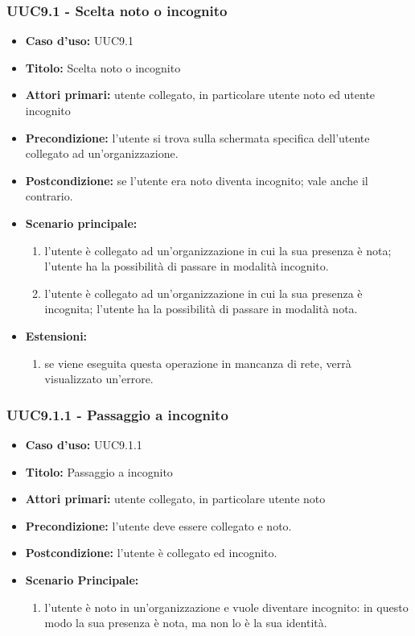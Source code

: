 \documentclass[casi-duso]{subfiles}
\begin{document}
\subsubsection{UUC9.1 - Scelta noto o incognito}%
\label{subsub:UUC9.1utente}
\begin{itemize}
  \item \textbf{Caso d’uso:} UUC9.1
  \item \textbf{Titolo:} Scelta noto o incognito
  \item \textbf{Attori primari:} utente collegato, in particolare utente noto ed utente incognito
  \item \textbf{Precondizione:} l'utente si trova sulla schermata specifica dell'utente collegato ad un'organizzazione.
  \item \textbf{Postcondizione:} se l'utente era noto diventa incognito; vale anche il contrario.
  \item \textbf{Scenario principale:}
        \begin{enumerate}
          \item l'utente è collegato ad un'organizzazione in cui la sua presenza è nota; l'utente ha la possibilità di passare in modalità incognito.
          \item l'utente è collegato ad un'organizzazione in cui la sua presenza è incognita; l'utente ha la possibilità di passare in modalità nota.
        \end{enumerate}
  \item \textbf{Estensioni:}
        \begin{enumerate}
          \item se viene eseguita questa operazione in mancanza di rete, verrà visualizzato un'errore.
        \end{enumerate}
\end{itemize}

\subsubsection{UUC9.1.1 - Passaggio a incognito}%
\label{subsub:UUC9.1.1utente}
\begin{itemize}
  \item \textbf{Caso d’uso:} UUC9.1.1
  \item \textbf{Titolo:} Passaggio a incognito
  \item \textbf{Attori primari:} utente collegato, in particolare utente noto
  \item \textbf{Precondizione:} l'utente deve essere collegato e noto.
  \item \textbf{Postcondizione:} l'utente è collegato ed incognito.
  \item \textbf{Scenario Principale:}
        \begin{enumerate}
          \item l'utente è noto in un'organizzazione e vuole diventare incognito: in questo modo la sua presenza è nota, ma non lo è la sua identità.
        \end{enumerate}
\end{itemize}
\end{document}
